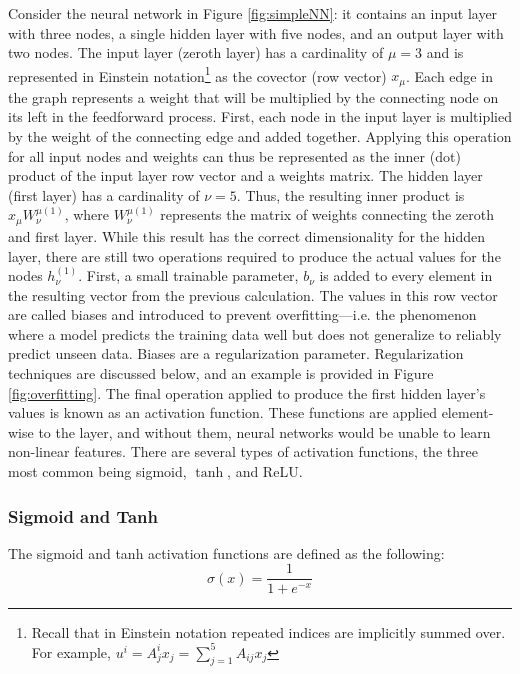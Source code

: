 Consider the neural network in Figure \ref{fig:simpleNN}: it contains an input layer with three nodes, a single hidden layer with five nodes, and an output layer with two nodes. The input layer (zeroth layer) has a cardinality of $ \mu=3 $ and is represented in Einstein notation\footnote{Recall that in Einstein notation repeated indices are implicitly summed over. For example, ${u^i = A^i_j x_j = \sum_{j=1}^5 A_{ij} x_j}$ } as the covector (row vector) $ x_\mu $. Each edge in the graph represents a weight that will be multiplied by the connecting node on its left in the feedforward process. First, each node in the input layer is multiplied by the weight of the connecting edge and added together. Applying this operation for all input nodes and weights can thus be represented as the inner (dot) product of the input layer row vector and a weights matrix. The hidden layer (first layer) has a cardinality of $ \nu=5 $. Thus, the resulting inner product is $ x_\mu W_\nu^{\mu(1)} $, where $ W_\nu^{\mu(1)} $ represents the matrix of weights connecting the zeroth and first layer. While this result has the correct dimensionality for the hidden layer, there are still two operations required to produce the actual values for the nodes $ h_\nu^{(1)} $. First, a small trainable parameter, $ b_\nu $  is added to every element in the resulting vector from the previous calculation. The values in this row vector are called biases and introduced to prevent overfitting---i.e. the phenomenon where a model predicts the training data well but does not generalize to reliably predict unseen data. Biases are a regularization parameter. Regularization techniques are discussed below, and an example is provided in Figure \ref{fig:overfitting}. The final operation applied to produce the first hidden layer's values is known as an activation function. These functions are applied element-wise to the layer, and without them, neural networks would be unable to learn non-linear features. There are several types of activation functions, the three most common being sigmoid, $\tanh$, and ReLU.


\subsubsection{Sigmoid and Tanh}
The sigmoid and tanh activation functions are defined as the following:
\begin{equation}
    \label{sigmoid}
    \sigma (x) = \frac{1}{1 + e^{-x}}
\end{equation}

